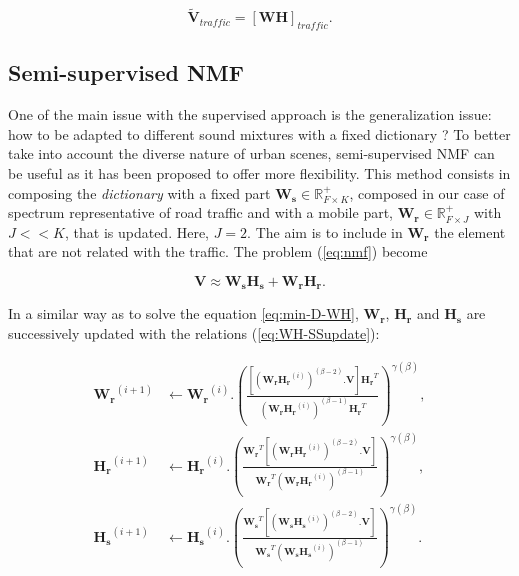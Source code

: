 \documentclass[twocolumn,a4paper,10pt]{article}
\begin{document}
\begin{equation}\label{eq:separationExtraction}
\mathbf{\tilde{V}}_{traffic} = \left[ \mathbf{WH} \right]_{traffic}.
\end{equation}

\subsection{Semi-supervised NMF}

One of the main issue with the supervised approach is the generalization issue: how to be adapted to different sound mixtures with a fixed dictionary ? To better take into account the diverse nature of urban scenes, semi-supervised NMF can be useful as it has been proposed \cite{lee_semi-supervised_2010} to offer more flexibility. This method consists in composing the \textit{dictionary} with a fixed part $\mathbf{W_s} \in \mathbb{R}^+_{F\times K}$, composed in our case of spectrum representative of road traffic and with a mobile part, $\mathbf{W_r} \in \mathbb{R}^+_{F\times J}$ with $J <<K$, that is updated. Here, $J = 2$. The aim is to include in $\mathbf{W_r}$ the element that are not related with the traffic. The problem (\ref{eq:nmf}) become

\begin{equation}
\mathbf{V} \approx \mathbf{W_s H_s}+ \mathbf{W_r H_r}.
\end{equation}

In a similar way as to solve the equation \ref{eq:min-D-WH}, $\mathbf{W_r}$, $\mathbf{H_r}$ and $\mathbf{H_s}$ are successively updated with the relations (\ref{eq:WH-SSupdate}):

{\scriptsize
\begin{subequations}\label{eq:WH-SSupdate}
\begin{align}
\mathbf{W_r}^{(i+1)} &\leftarrow \mathbf{W_r}^{(i)}.\left(\frac{\left[\left(\mathbf{W_r H_r}^{(i)} \right)^{(\beta-2)}.\mathbf{V} \right]\mathbf{H_r}^T}{\left(\mathbf{W_r H_r}^{(i)} \right)^{(\beta-1)}\mathbf{H_r}^T}\right)^{\gamma(\beta)}, \label{eq:W_r_SS}\\
\mathbf{H_r}^{(i+1)} &\leftarrow \mathbf{H_r}^{(i)}.\left(\frac{\mathbf{W_r}^T \left[\left(\mathbf{W_r H_r}^{(i)} \right)^{(\beta-2)}.\mathbf{V} \right]}{\mathbf{W_r}^T \left(\mathbf{W_r H_r}^{(i)} \right)^{(\beta-1)}}\right)^{\gamma(\beta)}, \label{eq:H_r_SS}\\
\mathbf{H_s}^{(i+1)} &\leftarrow \mathbf{H_s}^{(i)}.\left(\frac{\mathbf{W_s}^T \left[\left(\mathbf{W_s H_s}^{(i)} \right)^{(\beta-2)}.\mathbf{V} \right]}{\mathbf{W_s}^T \left(\mathbf{W_s H_s}^{(i)} \right)^{(\beta-1)}}\right)^{\gamma(\beta)}.\label{eq:H_s_SS}
\end{align}
\end{subequations}}
\end{document}
